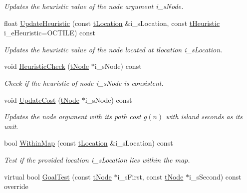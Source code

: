 \begin{DoxyCompactItemize}
\begin{DoxyCompactList}\small\item\em Updates the heuristic value of the node argument i\+\_\+s\+Node. \end{DoxyCompactList}\item 
float \mbox{\hyperlink{classplanner_1_1c_planner_a7d5f7f89a10b66f19c0257cbf7f2afbb}{Update\+Heuristic}} (const \mbox{\hyperlink{structplanner_1_1t_location}{t\+Location}} \&i\+\_\+s\+Location, const \mbox{\hyperlink{classplanner_1_1c_planner_a7f6dc4cbb69dd1ede14a67b0a7bd425b}{t\+Heuristic}} i\+\_\+e\+Heuristic=O\+C\+T\+I\+LE) const
\begin{DoxyCompactList}\small\item\em Updates the heuristic value of the node located at tlocation i\+\_\+s\+Location. \end{DoxyCompactList}\item 
void \mbox{\hyperlink{classplanner_1_1c_planner_a8b4f67bd192db4784c6ab95c11e51a16}{Heuristic\+Check}} (\mbox{\hyperlink{structplanner_1_1t_node}{t\+Node}} $\ast$i\+\_\+s\+Node) const
\begin{DoxyCompactList}\small\item\em Check if the heuristic of node i\+\_\+s\+Node is consistent. \end{DoxyCompactList}\item 
void \mbox{\hyperlink{classplanner_1_1c_planner_a82e45fc2701e90d3fa9df72f475e455e}{Update\+Cost}} (\mbox{\hyperlink{structplanner_1_1t_node}{t\+Node}} $\ast$i\+\_\+s\+Node) const
\begin{DoxyCompactList}\small\item\em Updates the node argument with its path cost $g(n)$ with island seconds as its unit. \end{DoxyCompactList}\item 
bool \mbox{\hyperlink{classplanner_1_1c_planner_ac5119e3243d9f6747f1da0ed6d356642}{Within\+Map}} (const \mbox{\hyperlink{structplanner_1_1t_location}{t\+Location}} \&i\+\_\+s\+Location) const
\begin{DoxyCompactList}\small\item\em Test if the provided location i\+\_\+s\+Location lies within the map. \end{DoxyCompactList}\item 
virtual bool \mbox{\hyperlink{classplanner_1_1c_planner_a8b241ebd7bb3bde3dd062c50a2a42339}{Goal\+Test}} (const \mbox{\hyperlink{structplanner_1_1t_node}{t\+Node}} $\ast$i\+\_\+s\+First, const \mbox{\hyperlink{structplanner_1_1t_node}{t\+Node}} $\ast$i\+\_\+s\+Second) const override

\end{DoxyCompactItemize}
